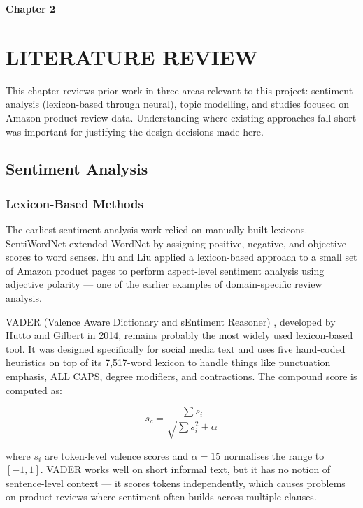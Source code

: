 \newpage
\textbf{\huge Chapter 2}
\section{LITERATURE REVIEW}
\begin{justify}
This chapter reviews prior work in three areas relevant to this project: sentiment analysis (lexicon-based through neural), topic modelling, and studies focused on Amazon product review data. Understanding where existing approaches fall short was important for justifying the design decisions made here.
\end{justify}

\subsection{Sentiment Analysis}

\subsubsection{Lexicon-Based Methods}
\begin{justify}
The earliest sentiment analysis work relied on manually built lexicons. SentiWordNet \cite{esuli2006sentiwordnet} extended WordNet by assigning positive, negative, and objective scores to word senses. Hu and Liu \cite{hu2004mining} applied a lexicon-based approach to a small set of Amazon product pages to perform aspect-level sentiment analysis using adjective polarity — one of the earlier examples of domain-specific review analysis.

VADER (Valence Aware Dictionary and sEntiment Reasoner) \cite{vader}, developed by Hutto and Gilbert in 2014, remains probably the most widely used lexicon-based tool. It was designed specifically for social media text and uses five hand-coded heuristics on top of its 7,517-word lexicon to handle things like punctuation emphasis, ALL CAPS, degree modifiers, and contractions. The compound score is computed as:

\begin{equation}
    s_c = \frac{\sum s_i}{\sqrt{\sum s_i^2 + \alpha}}
\end{equation}

where $s_i$ are token-level valence scores and $\alpha = 15$ normalises the range to $[-1, 1]$. VADER works well on short informal text, but it has no notion of sentence-level context — it scores tokens independently, which causes problems on product reviews where sentiment often builds across multiple clauses.
\end{justify}

